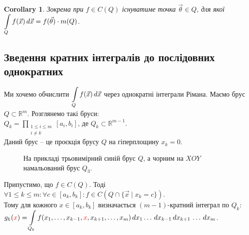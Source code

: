 \documentclass[a4paper, 10pt]{article}
\theoremstyle{theoremdd}
\theoremstyle{theoremdd}
\theoremstyle{theoremdd}
\theoremstyle{theoremdd}
\theoremstyle{theoremdd}
\theoremstyle{theoremdd}
\theoremstyle{theoremdd}
\theoremstyle{theoremdd}
\newtheorem{corollary}[theorem]{Corollary}
\begin{document}
\begin{corollary}
Зокрема при $f \in C(Q)$ існуватиме точка $\vec{\theta} \in Q$, для якої $\displaystyle\int\displaylimits_Q f(\vec{x})\,d\vec{x} = f(\vec{\theta}) \cdot m (Q)$.
\end{corollary}

\subsection{Зведення кратних інтегралів до послідовних однократних}
Ми хочемо обчислити $\displaystyle\int\displaylimits_Q f(\vec{x})\,d\vec{x}$ через однократні інтеграли Рімана. Маємо брус $Q \subset \mathbb{R}^m$. Розглянемо такі бруси:\\
$Q_k = \displaystyle\prod_{\substack{1 \leq i \leq m \\ i \neq k}} [a_i,b_i]$, де $Q_k \subset \mathbb{R}^{m-1}$. \\
Даний брус -- це проєкція брусу $Q$ на гіперплощину $x_k = 0$.\\
\begin{figure}[H]
\centering
{}
\caption*{На прикладі трьовимірний синій брус $Q$, а чорним на $XOY$ намальований брус $Q_3$.}
\end{figure}
Припустимо, що $f \in C(Q)$. Тоді $\forall 1 \leq k \leq m: \forall c \in [a_k,b_k]: f \in C(Q \cap \{ \vec{x} \mid x_k = c \})$.\\
Тому для кожного $x \in [a_k,b_k]$ визначається $(m-1)$-кратний інтеграл по $Q_k$:\\
$g_k(\textcolor{red}{x}) = \displaystyle\int\displaylimits_{Q_k}f(x_1,\dots,x_{k-1},\textcolor{red}{x},x_{k+1},\dots,x_m)\,dx_1\dots \,dx_{k-1}\,dx_{k+1}\,\dots\,dx_m$.
\end{document}
